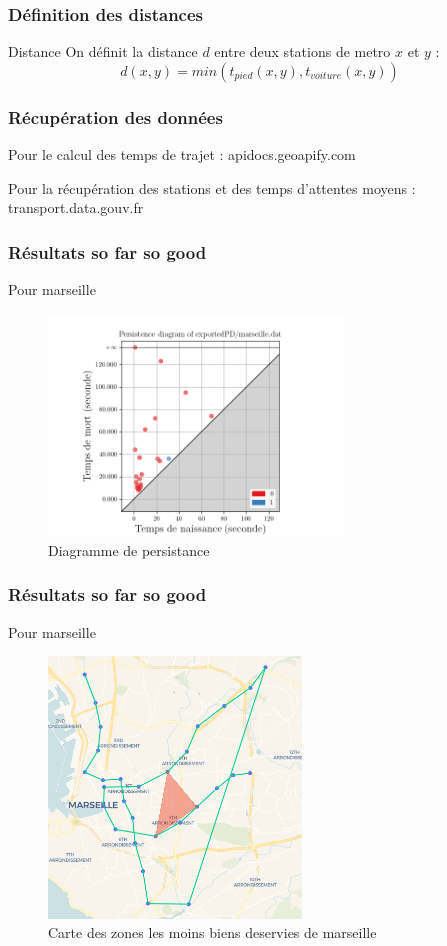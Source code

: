\documentclass{beamer}
\begin{document}
\begin{frame}
    \frametitle{Définition des distances}
    
    \begin{block}{Distance}
        On définit la distance $d$ entre deux stations de metro $x$ et $y$ : 
        $$ d(x,y) =  min(t_{pied}(x,y), t_{voiture}(x,y))$$
    \end{block}
\end{frame}

\begin{frame}
    \frametitle{Récupération des données}
    Pour le calcul des temps de trajet :  apidocs.geoapify.com

    Pour la récupération des stations et des temps d'attentes moyens : transport.data.gouv.fr
\end{frame}

\begin{frame}
    \frametitle{Résultats so far so good}
    Pour marseille 
    \begin{figure}
        \includegraphics[width=0.7\textwidth]{pd_marseille}
        \centering
        \caption{Diagramme de persistance}
    \end{figure}
\end{frame}

\begin{frame}
    \frametitle{Résultats so far so good}
    Pour marseille 
    \begin{figure}
        \includegraphics[width=0.6\textwidth]{marseille_carte}
        \centering
        \caption{Carte des zones les moins biens deservies de marseille}
    \end{figure}
\end{frame}
\end{document}
